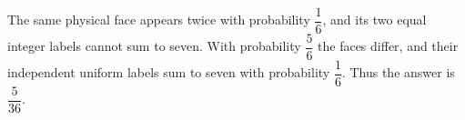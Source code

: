 The same physical face appears twice with probability $\dfrac{1}{6}$, and its two equal integer labels cannot sum to seven. With probability $\dfrac{5}{6}$ the faces differ, and their independent uniform labels sum to seven with probability $\dfrac{1}{6}$. Thus the answer is $\boxed{\dfrac{5}{36}}$.
